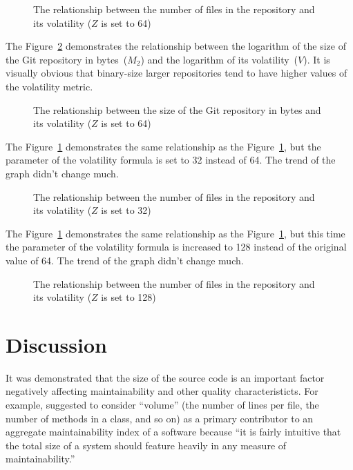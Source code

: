 \documentclass[sigconf]{acmart}
\begin{document}
\begin{figure}[h]
  
  \caption{The relationship between the number of files in the repository and its volatility ($Z$ is set to 64)}
  \label{fig:1}
\end{figure}

The Figure~\ref{fig:2} demonstrates the relationship between
the logarithm of the size of the Git repository in bytes~($M_2$) and
the logarithm of its volatility~($V$).
It is visually obvious that
binary-size larger repositories tend to have higher values
of the volatility metric.

\begin{figure}[h]
  
  \caption{The relationship between the size of the Git repository in bytes and its volatility ($Z$ is set to 64)}
  \label{fig:2}
\end{figure}

The Figure~\ref{fig:1} demonstrates the same relationship as the Figure~\ref{fig:1},
but the parameter of the volatility formula is set to 32 instead of 64. The
trend of the graph didn't change much.

\begin{figure}[h]
  
  \caption{The relationship between the number of files in the repository and its volatility ($Z$ is set to 32)}
  \label{fig:3}
\end{figure}

The Figure~\ref{fig:1} demonstrates the same relationship as the Figure~\ref{fig:1},
but this time the parameter of the volatility formula is increased to 128
instead of the original value of 64. The trend of the graph didn't change much.

\begin{figure}[h]
  
  \caption{The relationship between the number of files in the repository and its volatility ($Z$ is set to 128)}
  \label{fig:4}
\end{figure}

\section{Discussion}
\label{sec:discussion}

It was demonstrated that the size of the source code is an important
factor negatively affecting maintainability and other quality characteristicts.
For example, \citet{heitlager2007} suggested to consider ``volume''
(the number of lines per file, the number of methods in a class,
and so on) as a primary contributor to an aggregate maintainability index
of a software because ``it is fairly intuitive that the total size of a system should
feature heavily in any measure of maintainability.''
\end{document}

